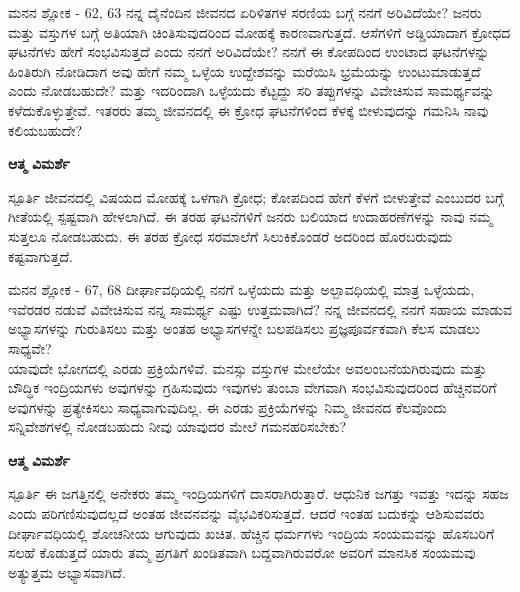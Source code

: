 \newpage
\begin{mananam}{\mananamfont ಮನನ ಶ್ಲೋಕ - \textenglish{62, 63}}
\footnotesize \mananamtext ನನ್ನ ದೈನೆಂದಿನ ಜೀವನದ ಏರಿಳಿತಗಳ ಸರಣಿಯ ಬಗ್ಗೆ ನನಗೆ ಅರಿವಿದೆಯೇ? ಜನರು ಮತ್ತು ವಸ್ತುಗಳ ಬಗ್ಗೆ ಅತಿಯಾಗಿ ಚಿಂತಿಸುವುದರಿಂದ ಮೋಹಕ್ಕೆ ಕಾರಣವಾಗುತ್ತದೆ. ಆಸೆಗಳಿಗೆ  ಅಡ್ಡಿಯಾದಾಗ ಕ್ರೋಧದ ಘಟನೆಗಳು ಹೇಗೆ ಸಂಭವಿಸುತ್ತದೆ ಎಂದು ನನಗೆ ಅರಿವಿದೆಯೇ? ನನಗೆ ಈ ಕೋಪದಿಂದ ಉಂಟಾದ ಘಟನೆಗಳನ್ನು ಹಿಂತಿರುಗಿ ನೋಡಿದಾಗ ಅವು ಹೇಗೆ ನಮ್ಮ ಒಳ್ಳೆಯ ಉದ್ದೇಶವನ್ನು ಮರೆಯಿಸಿ ಭ್ರಮೆಯನ್ನು ಉಂಟುಮಾಡುತ್ತದೆ ಎಂದು ನೋಡಬಹುದೇ? ಮತ್ತು  ಇದರಿಂದಾಗಿ ಒಳ್ಳೆಯದು ಕೆಟ್ಟದ್ದು ಸರಿ ತಪ್ಪುಗಳನ್ನು ವಿವೇಚಿಸುವ ಸಾಮರ್ಥ್ಯವನ್ನು ಕಳೆದುಕೊಳ್ಳುತ್ತೇವೆ. ಇತರರು ತಮ್ಮ ಜೀವನದಲ್ಲಿ ಈ ಕ್ರೋಧ ಘಟನೆಗಳಿಂದ ಕೆಳಕ್ಕೆ ಬೀಳುವುದನ್ನು ಗಮನಿಸಿ ನಾವು ಕಲಿಯಬಹುದೇ? 
\end{mananam}
\WritingHand\enspace\textbf{ಆತ್ಮ ವಿಮರ್ಶೆ}
\begin{inspiration}{\mananamfont ಸ್ಪೂರ್ತಿ}
\footnotesize \mananamtext ಜೀವನದಲ್ಲಿ ವಿಷಯದ ಮೋಹಕ್ಕೆ ಒಳಗಾಗಿ ಕ್ರೋಧ; ಕೋಪದಿಂದ ಹೇಗೆ ಕೆಳಗೆ ಬೀಳುತ್ತೇವೆ ಎಂಬುದರ ಬಗ್ಗೆ ಗೀತೆಯಲ್ಲಿ ಸ್ಪಷ್ಟವಾಗಿ  ಹೇಳಲಾಗಿದೆ. ಈ ತರಹ ಘಟನೆಗಳಿಗೆ ಜನರು ಬಲಿಯಾದ ಉದಾಹರಣೆಗಳನ್ನು ನಾವು ನಮ್ಮ ಸುತ್ತಲೂ ನೋಡಬಹುದು. ಈ ತರಹ ಕ್ರೋಧ ಸರಮಾಲೆಗೆ ಸಿಲುಕಿಕೊಂಡರೆ ಅದರಿಂದ ಹೊರಬರುವುದು ಕಷ್ಟವಾಗುತ್ತದೆ. 
\end{inspiration}
\newpage

\begin{mananam}{\mananamfont ಮನನ ಶ್ಲೋಕ - \textenglish{67, 68}}
\footnotesize \mananamtext ದೀರ್ಘಾವಧಿಯಲ್ಲಿ ನನಗೆ ಒಳ್ಳೆಯದು ಮತ್ತು ಅಲ್ಪಾವಧಿಯಲ್ಲಿ ಮಾತ್ರ ಒಳ್ಳೆಯದು, ಇವೆರಡರ ನಡುವೆ ವಿವೇಚಿಸುವ ನನ್ನ ಸಾಮರ್ಥ್ಯ ಎಷ್ಟು ಉತ್ತಮವಾಗಿದೆ? ನನ್ನ ಜೀವನದಲ್ಲಿ ನನಗೆ ಸಹಾಯ ಮಾಡುವ ಅಭ್ಯಾಸಗಳನ್ನು ಗುರುತಿಸಲು ಮತ್ತು ಅಂತಹ ಅಭ್ಯಾಸಗಳನ್ನೇ ಬಲಪಡಿಸಲು ಪ್ರಜ್ಞಪೂರ್ವಕವಾಗಿ ಕೆಲಸ ಮಾಡಲು ಸಾಧ್ಯವೇ?\\
ಯಾವುದೇ ಭೋಗದಲ್ಲಿ ಎರಡು ಪ್ರಕ್ರಿಯೆಗಳಿವೆ. ಮನಸ್ಸು ವಸ್ತುಗಳ ಮೇಲೆಯೇ ಅವಲಂಬನೆಯಗಿರುವುದು ಮತ್ತು ಬೌದ್ಧಿಕ ಇಂದ್ರಿಯಗಳು ಅವುಗಳನ್ನು ಗ್ರಹಿಸುವುದು ಇವುಗಳು ತುಂಬಾ ವೇಗವಾಗಿ ಸಂಭವಿಸುವುದರಿಂದ ಹೆಚ್ಚಿನವರಿಗೆ ಅವುಗಳನ್ನು ಪ್ರತ್ಯೇಕಿಸಲು ಸಾಧ್ಯವಾಗುವುದಿಲ್ಲ. ಈ ಎರಡು ಪ್ರಕ್ರಿಯೆಗಳನ್ನು ನಿಮ್ಮ ಜೀವನದ ಕೆಲವೊಂದು ಸನ್ನಿವೇಶಗಳಲ್ಲಿ ನೋಡಬಹುದು ನೀವು ಯಾವುದರ ಮೇಲೆ ಗಮನಹರಿಸಬೇಕು?
\end{mananam}
\WritingHand\enspace\textbf{ಆತ್ಮ ವಿಮರ್ಶೆ}
\begin{inspiration}{\mananamfont ಸ್ಪೂರ್ತಿ}
\footnotesize \mananamtext ಈ ಜಗತ್ತಿನಲ್ಲಿ ಅನೇಕರು ತಮ್ಮ ಇಂದ್ರಿಯಗಳಿಗೆ ದಾಸರಾಗಿರುತ್ತಾರೆ. ಆಧುನಿಕ ಜಗತ್ತು ಇವತ್ತು ಇದನ್ನು ಸಹಜ ಎಂದು ಪರಿಗಣಿಸುವುದಲ್ಲದೆ ಅಂತಹ ಜೀವನವನ್ನು ವೈಭವಿಕರಿಸುತ್ತದೆ. ಆದರೆ ಇಂತಹ ಬದುಕನ್ನು ಆಶಿಸುವವರು ದೀರ್ಘಾವಧಿಯಲ್ಲಿ ಶೋಚನೀಯ ಆಗುವುದು ಖಚಿತ. ಹೆಚ್ಚಿನ ಧರ್ಮಗಳು ಇಂದ್ರಿಯ ಸಂಯಮವನ್ನು ಹೊಸಬರಿಗೆ ಸಲಹೆ ಕೊಡುತ್ತದೆ ಯಾರು ತಮ್ಮ ಪ್ರಗತಿಗೆ ಖಂಡಿತವಾಗಿ ಬದ್ದವಾಗಿರುವರೋ ಅವರಿಗೆ ಮಾನಸಿಕ ಸಂಯಮವು ಅತ್ಯುತ್ತಮ ಅಭ್ಯಾಸವಾಗಿದೆ.
\end{inspiration}
\newpage

